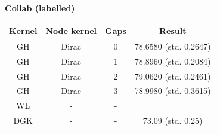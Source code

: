 \documentclass{article}
\begin{document}
\textbf{Collab (labelled)}\\
\begin{minipage}{0.6\linewidth}
	\hspace*{-1in}

	\label{fig:collab}
\end{minipage}
\begin{minipage}[c]{0.5\linewidth}
	
	\centering
	\begin{tabular}{c|c|c|c}
		Kernel & Node kernel & Gaps & Result\\
		\hline
		GH & Dirac & 0 & 78.6580 (std. 0.2647)\\
		GH & Dirac & 1 & 78.8960 (std. 0.2084)\\
		GH & Dirac & 2 & 79.0620 (std. 0.2461)\\
		GH & Dirac & 3 & 78.9980 (std. 0.3615)\\
		WL & - & - & \\
		DGK & - & - & 73.09 (std. 0.25)\\
	\end{tabular}
	\label{table:collab}
\end{minipage}
\end{document}
